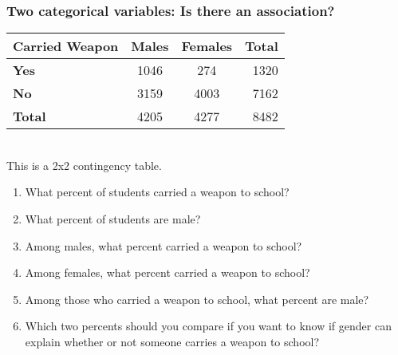 \begin{frame}
\frametitle{Two categorical variables: Is there an association?}
\begin{table}
\begin{tabular}{|l|cc|r|}
    \hline
    \textbf{Carried Weapon}    & \textbf{Males} & \textbf{Females} & \textbf{Total} \\
    \hline\hline
    \textbf{Yes}      &  1046 & 274 & 1320 \\
    \textbf{No}       &  3159 & 4003 & 7162 \\
    \hline
    \textbf{Total} & 4205 & 4277 & 8482 \\
    \hline
\end{tabular}\\%
This is a 2x2 contingency table.
\end{table}
\begin{enumerate}
    \item
    What percent of students carried a weapon to school?
    \item
    What percent of students are male?
    \item
    Among males, what percent carried a weapon to school?
    \item
    Among females, what percent carried a weapon to school?
    \item
    Among those who carried a weapon to school, what percent are male?
    \item 
    Which two percents should you compare if you want to know if gender can explain whether or not someone carries a weapon to school?
\end{enumerate}
\end{frame}


